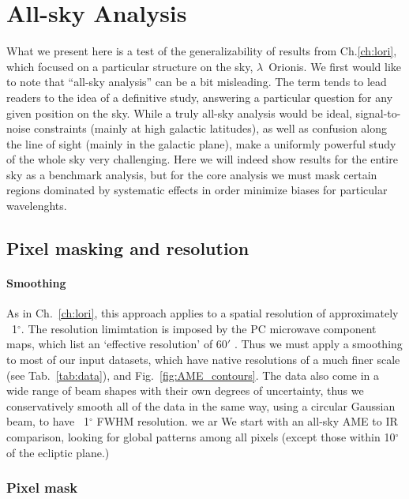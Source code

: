 \chapter{All-sky Analysis}
  \label{sec:analysis}

    What we present here is a test of the generalizability of results from Ch.\ref{ch:lori}, which focused on a particular structure on the sky, $\lambda$~Orionis.
    We first would like to note that ``all-sky analysis'' can be a bit misleading. The term tends to lead readers to the idea of a definitive study, answering a particular question for any given position on the sky.  While a truly all-sky analysis would be ideal, signal-to-noise constraints (mainly at high galactic latitudes), as well as confusion along the line of sight (mainly in the galactic plane), make a uniformly powerful study of the whole sky very challenging. Here we will indeed show results for the entire sky as a benchmark analysis, but for the core analysis we must mask certain regions dominated by systematic effects in order minimize biases for particular wavelenghts.

\section{Pixel masking and resolution}
    \subsubsection{Smoothing}
        As in Ch.~\ref{ch:lori}, this approach applies to a spatial resolution of approximately ~1$^{\circ}$. The resolution limimtation is imposed by the PC microwave component maps, which list an `effective resolution' of 60$'$ \citep{planck15X}. Thus we must apply a smoothing to most of our input datasets, which have native resolutions of a much finer scale (see Tab.~\ref{tab:data}), and Fig.~\ref{fig:AME_contours}. The data also come in a wide range of beam shapes with their own degrees of uncertainty, thus we conservatively smooth all of the data in the same way, using a circular Gaussian beam, to have ~1$^{\circ}$ FWHM resolution. we ar We start with an all-sky AME to IR comparison, looking for global patterns among all pixels (except those within 10$^{\circ}$ of the ecliptic plane.)
    \subsection{Pixel mask}
